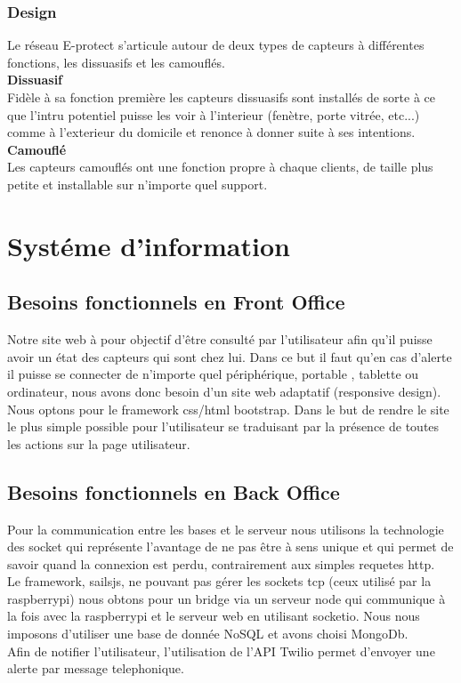 \subsubsection{Design}
Le réseau E-protect s'articule autour de deux types de capteurs à différentes fonctions, les dissuasifs et les camouflés.\\
\textbf{Dissuasif}\\
Fidèle à sa fonction première les capteurs dissuasifs sont installés de sorte à ce que l'intru potentiel puisse les voir à l'interieur (fenètre, porte vitrée, etc...) comme à l'exterieur du domicile et renonce à donner suite à ses intentions.\\
\textbf{Camouflé}\\
Les capteurs camouflés ont une fonction propre à chaque clients, de taille plus petite et installable sur n'importe quel support.

\section{Systéme d'information}

\subsection{Besoins fonctionnels en Front Office}

Notre site web à pour objectif d’être consulté par l'utilisateur afin qu'il puisse avoir un état des capteurs qui sont chez lui. Dans ce but il faut qu'en cas d’alerte il puisse se connecter de n'importe quel périphérique, portable , tablette ou ordinateur, nous avons donc besoin d'un site web adaptatif (responsive design).\\
Nous optons pour le framework css/html bootstrap. Dans le but de rendre le site le plus simple possible pour l’utilisateur se traduisant par la présence de toutes les actions sur la page utilisateur.\\

\subsection{Besoins fonctionnels en Back Office}
Pour la communication entre les bases et le serveur nous utilisons la technologie des socket qui représente l’avantage de ne pas être à sens unique et qui permet de savoir quand la connexion est perdu, contrairement aux simples requetes http.\\
Le framework, sailsjs, ne pouvant pas gérer les sockets tcp (ceux utilisé par la raspberrypi) nous obtons pour un bridge via un serveur node qui communique à la fois avec la raspberrypi et le serveur web en utilisant socketio. Nous nous imposons d’utiliser une base de donnée NoSQL et avons choisi MongoDb.\\

Afin de notifier l'utilisateur, l'utilisation de l’API Twilio permet d'envoyer une alerte par message telephonique.\\